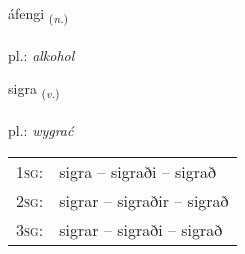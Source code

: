 \documentclass[frontgrid, backgrid]{flacards}\usepackage[]{graphicx}\usepackage[]{xcolor}
\begin{document}
{áfengi \small{\textsubscript{(\textit{n.})}} \\[1ex] %
\textphonetic{[auːfeiɲcɪ]} \\
pl.: \emph{alkohol} \\  [2ex]
\renewcommand*{\arraystretch}{0.8}
}

\renewcommand{\flhead}{\vskip5pt \fboxsep=0pt {\small\bfseries\footnotesize Sagnorð | Verb}}
\renewcommand{\fcfoot}{\vskip5pt \fboxsep=0pt \hspace{2pt}{\small\bfseries\footnotesize 2K}}

\renewcommand{\blhead}{\vskip5pt {\small\bfseries\footnotesize Sagnorð | Verb }}
\renewcommand{\bcfoot}{\vskip5pt \hspace{2pt}{\small\bfseries\footnotesize 2K}}


{sigra \small{\textsubscript{(\textit{v.})}} \\[1ex] %
\textphonetic{[sɪɣra]} \\
pl.: \emph{wygrać} \\  [2ex]
\renewcommand*{\arraystretch}{0.8}
\begin{tabular}{p{1cm}l}
\textsc{1sg}: & sigra -- sigraði -- sigrað \\ 
\textsc{2sg}: & sigrar -- sigraðir -- sigrað \\ 
\textsc{3sg}: & sigrar -- sigraði -- sigrað \\ 
\end{tabular}
}

\renewcommand{\flhead}{\vskip5pt \fboxsep=0pt {\small\bfseries\footnotesize Sagnorð | Verb}}
\renewcommand{\fcfoot}{\vskip5pt \fboxsep=0pt \hspace{2pt}{\small\bfseries\footnotesize 2K}}
\end{document}
